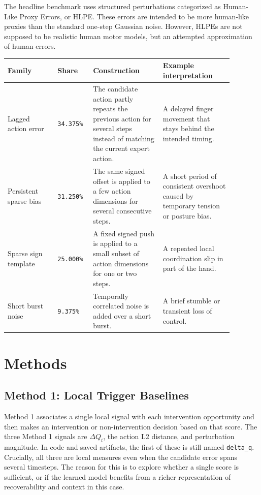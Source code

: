 \documentclass[11pt]{article}
\begin{document}
The headline benchmark uses structured perturbations categorized as Human-Like Proxy Errors, or HLPE. These errors are intended to be more human-like proxies than the standard one-step Gaussian noise. However, HLPEs are not supposed to be realistic human motor models, but an attempted approximation of human errors. 

\begin{table}[h]
\centering
\small
\begin{tabular}{>{\raggedright\arraybackslash}p{0.20\linewidth}>{\raggedright\arraybackslash}p{0.12\linewidth}>{\raggedright\arraybackslash}p{0.28\linewidth}>{\raggedright\arraybackslash}p{0.28\linewidth}}
\toprule
Family & Share & Construction & Example interpretation \\
\midrule
Lagged action error & \texttt{34.375\%} & The candidate action partly repeats the previous action for several steps instead of matching the current expert action. & A delayed finger movement that stays behind the intended timing. \\
Persistent sparse bias & \texttt{31.250\%} & The same signed offset is applied to a few action dimensions for several consecutive steps. & A short period of consistent overshoot caused by temporary tension or posture bias. \\
Sparse sign template & \texttt{25.000\%} & A fixed signed push is applied to a small subset of action dimensions for one or two steps. & A repeated local coordination slip in part of the hand. \\
Short burst noise & \texttt{9.375\%} & Temporally correlated noise is added over a short burst. & A brief stumble or transient loss of control. \\
\bottomrule
\end{tabular}
\end{table}

\section{Methods}

\subsection*{Method 1: Local Trigger Baselines}

Method 1 associates a single local signal with each intervention opportunity and then makes an intervention or non-intervention decision based on that score. The three Method 1 signals are \(\Delta Q_t\), the action L2 distance, and perturbation magnitude. In code and saved artifacts, the first of these is still named \texttt{delta\_q}. Crucially, all three are local measures even when the candidate error spans several timesteps. The reason for this is to explore whether a single score is sufficient, or if the learned model benefits from a richer representation of recoverability and context in this case.
\end{document}
